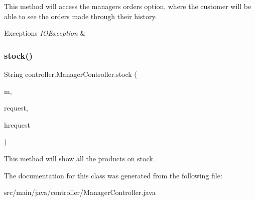 This method will access the manager\textquotesingle{}s \textquotesingle{}orders\textquotesingle{} option, where the customer will be able to see the orders made through their history. 
\begin{DoxyExceptions}{Exceptions}
{\em I\+O\+Exception} & \\
\hline
\end{DoxyExceptions}
\mbox{\label{classcontroller_1_1_manager_controller_a390147f47b5df4b5f24573f167067d71}} 
\subsubsection{\texorpdfstring{stock()}{stock()}}
{\footnotesize\ttfamily String controller.\+Manager\+Controller.\+stock (\begin{DoxyParamCaption}\item[{Model}]{m,  }\item[{Web\+Request}]{request,  }\item[{Http\+Servlet\+Request}]{hrequest }\end{DoxyParamCaption})\hspace{0.3cm}{\ttfamily [inline]}}

This method will show all the products on stock. 

The documentation for this class was generated from the following file\+:\begin{DoxyCompactItemize}
\item 
src/main/java/controller/Manager\+Controller.\+java\end{DoxyCompactItemize}
